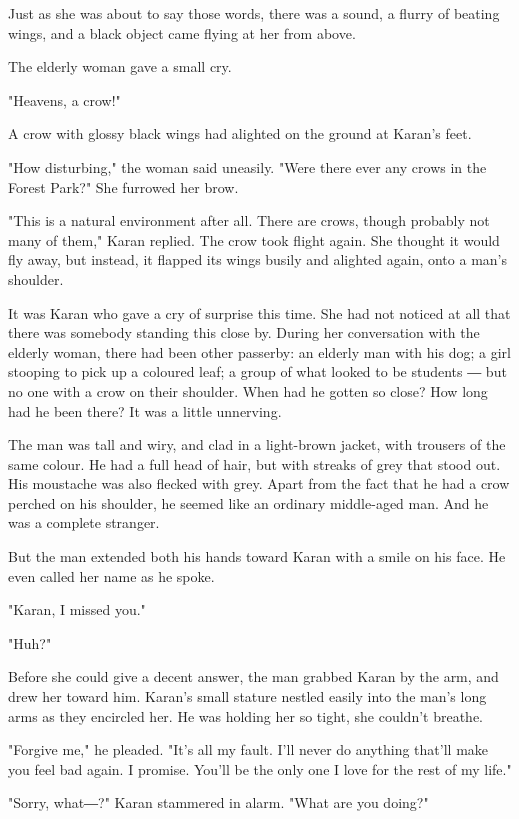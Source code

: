 Just as she was about to say those words, there was a sound, a flurry of
beating wings, and a black object came flying at her from above.

The elderly woman gave a small cry.

"Heavens, a crow!"

A crow with glossy black wings had alighted on the ground at Karan's
feet.~

"How disturbing," the woman said uneasily. "Were there ever any crows in
the Forest Park?" She furrowed her brow.

"This is a natural environment after all. There are crows, though
probably not many of them," Karan replied. The crow took flight again.
She thought it would fly away, but instead, it flapped its wings busily
and alighted again, onto a man's shoulder.~

It was Karan who gave a cry of surprise this time. She had not noticed
at all that there was somebody standing this close by. During her
conversation with the elderly woman, there had been other passerby: an
elderly man with his dog; a girl stooping to pick up a coloured leaf; a
group of what looked to be students ― but no one with a crow on their
shoulder. When had he gotten so close? How long had he been there? It
was a little unnerving.

The man was tall and wiry, and clad in a light-brown jacket, with
trousers of the same colour. He had a full head of hair, but with
streaks of grey that stood out. His moustache was also flecked with
grey. Apart from the fact that he had a crow perched on his shoulder, he
seemed like an ordinary middle-aged man. And he was a complete stranger.

But the man extended both his hands toward Karan with a smile on his
face. He even called her name as he spoke.

"Karan, I missed you."

"Huh?"

Before she could give a decent answer, the man grabbed Karan by the arm,
and drew her toward him. Karan's small stature nestled easily into the
man's long arms as they encircled her. He was holding her so tight, she
couldn't breathe.

"Forgive me," he pleaded. "It's all my fault. I'll never do anything
that'll make you feel bad again. I promise. You'll be the only one I
love for the rest of my life."

"Sorry, what―?" Karan stammered in alarm. "What are you doing?"

